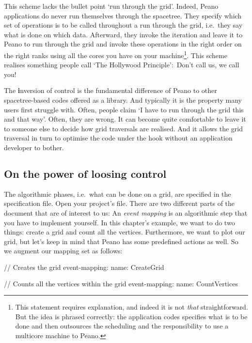 This scheme lacks the bullet point `run through the grid'. 
Indeed, Peano applications do never run themselves through the spacetree.
They specify which set of operations is to be called throughout a run through
the grid, i.e.~they say what is done on which data.
Afterward, they invoke the iteration and leave it to Peano to run through the
grid and invoke these operations in the right order on the right ranks using all
the cores you have on your machine\footnote{This statement requires
explanation, and indeed it is not {\em that} straightforward. But the idea is
phrased correctly: the application codes specifies what is to be done and then
outsources the scheduling and the responsibility to use a multicore machine to
Peano.}.
This scheme realises something people call `The Hollywood Principle': Don't
call us, we call you!


\begin{remark}
  The {\textbf inversion of control} is the fundamental difference of Peano to other
  spacetree-based codes offered as a library. 
  And typically it is the property many users first struggle with.
  Often, people claim `I have to run through the grid this and that way'. 
  Often, they are wrong.
  It can become quite comfortable to leave it to someone else to decide how 
  grid traversals are realised.
  And it allows the grid traversal in turn to optimise the code under the hook
  without an application developer to bother.
\end{remark}


\subsection{On the power of loosing control}

The algorithmic phases, i.e.~what can be done on a grid, are specified in the
specification file.
Open your project's file. 
There are two different parts of the document that are of interest to us:
An {\em event mapping} is an algorithmic step that you have to implement
yourself.
In this chapter's example, we want to do two things: create a grid and count all
the vertices. 
Furthermore, we want to plot our grid, but let's keep in mind that Peano has
some predefined actions as well.
So we augment our mapping set as follows:

\begin{code}
// Creates the grid
event-mapping:
  name: CreateGrid

// Counts all the vertices within the grid
event-mapping:
  name: CountVertices
\end{code}

